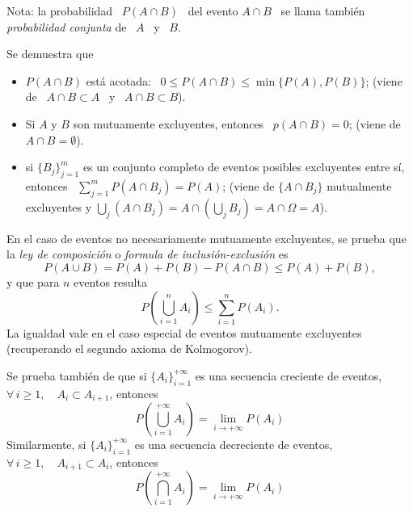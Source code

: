 \begin{figure}[h!]
\begin{center}  \end{center}
%
\label{fig:MP:CompletoSub}
\end{figure}

Nota:  la probabilidad  \ $P(A  \cap B)$  \ del  evento $A  \cap B$  \  se llama
tambi\'en {\it probabilidad conjunta} de \ $A$ \ y \ $B$.

Se demuestra que
%
\begin{itemize}
\item $P(A  \cap B)$ est\'a acotada:  \ $0 \leq P(A  \cap B) \leq  \min\{ P(A) ,
  P(B)\}$; (viene de \ $A \cap B \subset A$ \ y \ $A \cap B \subset B$).
%
\item Si  $A$ y $B$ son  mutuamente excluyentes, entonces  \ $p(A \cap B)  = 0$;
  (viene de \ $A \cap B = \emptyset$).
%
\item  si  $\{ B_j  \}_{j=1}^m$  es un  conjunto  completo  de eventos  posibles
  excluyentes entre s\'i, entonces \ $\sum_{j=1}^m P(A \cap B_j) = P(A)$; (viene
  de  $\{ A  \cap B_j  \}$ mutualmente  excluyentes y  $\bigcup_j \left(  A \cap
    B_j\right) = A \cap \left( \bigcup_j B_j \right) = A \cap \Omega = A$).
\end{itemize}

En el caso de eventos no necesariamente mutuamente excluyentes, se prueba que la
{\it ley de composici\'on} o {\it formula de inclusi\'on-exclusi\'on} es
%
\[
P(A \cup B) = P(A) + P(B) - P(A \cap B) \leq P(A) + P(B), 
\]
%
y que para $n$ eventos resulta
%
\[
P\left( \bigcup_{i=1}^n A_i \right) \leq \sum_{i=1}^n P\left( A_i \right).
\]
%
La  igualdad  vale  en  el  caso  especial  de  eventos  mutuamente  excluyentes
(recuperando el segundo axioma de Kolmogorov).

Se  prueba tambi\'en  de que  si $\{  A_i \}_{i=1}^{+\infty}$  es  una secuencia
creciente  de eventos,  \ie $\forall  \, i  \ge 1,  \quad A_i  \subset A_{i+1}$,
entonces
%
\[
P\left( \bigcup_{i=1}^{+\infty} A_i \right) = \lim_{i \to +\infty} P(A_i)
\]
%
Similarmente,  si $\{ A_i  \}_{i=1}^{+\infty}$ es  una secuencia  decreciente de
eventos, \ie $\forall \, i \ge 1, \quad A_{i+1} \subset A_i$, entonces
%
\[
P\left( \bigcap_{i=1}^{+\infty} A_i \right) = \lim_{i \to +\infty} P(A_i)
\]


